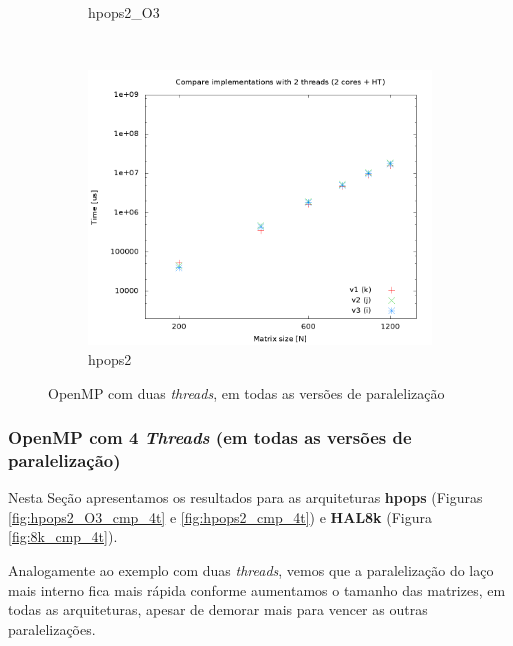 \documentclass[a4paper, 12pt]{article}
\begin{document}
\begin{figure}[H]
\begin{subfigure}[H]{0.5\textwidth}
        \caption{hpops2\_O3}
        \label{fig:hpops2_O3_cmp_2t}
    \end{subfigure}
    ~ %
    \begin{subfigure}[H]{0.5\textwidth}
        \includegraphics[width=\textwidth]{hpops2_cmp_versions-2t}
        \caption{hpops2}
        \label{fig:hpops2_cmp_2t}
    \end{subfigure}%
    \caption{OpenMP com duas \textit{threads}, em todas as versões de paralelização}\label{fig:animals}
\end{figure}

\newpage
\subsubsection{OpenMP com 4 \textit{Threads} (em todas as versões de paralelização)}

Nesta Seção apresentamos os resultados para as arquiteturas \textbf{hpops}
(Figuras \ref{fig:hpops2_O3_cmp_4t} e \ref{fig:hpops2_cmp_4t}) e \textbf{HAL8k}
(Figura \ref{fig:8k_cmp_4t}).

Analogamente ao exemplo com duas \textit{threads}, vemos que a paralelização do
laço mais interno fica mais rápida conforme aumentamos o tamanho das matrizes,
em todas as arquiteturas, apesar de demorar mais para vencer as outras
paralelizações.
\end{document}
